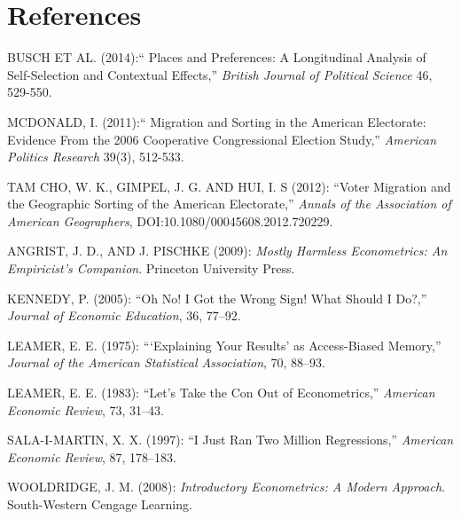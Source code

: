 \documentclass[12pt, a4paper]{article}
\begin{document}

\newpage

%
%

\section*{\label{sec_ref}References}

BUSCH ET AL. (2014):`` Places and Preferences: A Longitudinal Analysis of Self-Selection and Contextual Effects,'' \textit{British Journal of Political Science} 46, 529-550.

\noindent MCDONALD, I. (2011):`` Migration and Sorting in the American Electorate: Evidence From the 2006 Cooperative Congressional Election Study,'' \textit{American Politics Research} 39(3), 512-533.

\noindent TAM CHO, W. K., GIMPEL, J. G. AND HUI, I. S (2012): ``Voter Migration and the Geographic Sorting of the
American Electorate,'' \textit{Annals of the Association of American Geographers}, DOI:10.1080/00045608.2012.720229.
 

\noindent ANGRIST, J. D., AND J. PISCHKE (2009): \textit{Mostly Harmless Econometrics: An Empiricist's Companion}. Princeton University Press.
    
\noindent KENNEDY, P. (2005): ``Oh No! I Got the Wrong Sign! What Should I Do?,'' \textit{Journal of Economic Education}, 36, 77--92.
    
\noindent LEAMER, E. E. (1975): ```Explaining Your Results' as Access-Biased Memory,'' \textit{Journal of the American Statistical Association}, 70, 88--93.
    
\noindent LEAMER, E. E. (1983): ``Let's Take the Con Out of Econometrics,'' \textit{American Economic Review}, 73, 31--43.
    
\noindent SALA-I-MARTIN, X. X. (1997): ``I Just Ran Two Million Regressions,'' \textit{American Economic Review}, 87, 178--183.

\noindent WOOLDRIDGE, J. M. (2008): \textit{Introductory Econometrics: A Modern Approach}. South-Western Cengage Learning.

\end{document}

